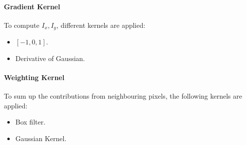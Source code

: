 \documentclass[landscape,a0paper,fontscale=0.292]{baposter}
\begin{document}
\begin{poster}
{\paragraph{Gradient Kernel} To compute $I_x, I_y$, different kernels are applied:
\begin{itemize}
\setlength\itemsep{0.1em}
\item $[-1,0,1]$.
\item Derivative of Gaussian.
\end{itemize}
\paragraph{Weighting Kernel} To sum up the contributions from neighbouring pixels, the following kernels are applied:
\begin{itemize}
\setlength\itemsep{0.1em}
\item Box filter.
\item Gaussian Kernel.
\end{itemize}
}
\end{poster}
\end{document}
